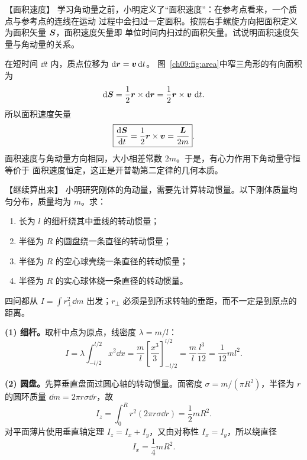 {
\begin{origexamplebox}{【面积速度】}\label{ch09:ex:s16-14-2}
学习角动量之前，小明定义了“面积速度”：在参考点看来，一个质点与参考点的连线在运动
过程中会扫过一定面积。按照右手螺旋方向把面积定义为面积矢量 $\bm{S}$，面积速度矢量即
单位时间内扫过的面积矢量。试说明面积速度矢量与角动量的关系。


\ThQArea
\end{origexamplebox}

\begin{xesolution}
\areaVelocityDiagram

在短时间 $\dd t$ 内，质点位移为 $\mathop{}\!\mathrm d\bm{r}=\bm{v}\mathop{}\!\mathrm d t$。
图~\ref{ch09:fig:area}中窄三角形的有向面积为
\[
 \mathop{}\!\mathrm d\bm{S}=\frac12\bm{r}\times\mathop{}\!\mathrm d\bm{r}
 =\frac12\bm{r}\times\bm{v}\,\mathop{}\!\mathrm d t.
\]
所以面积速度矢量
\[
 \boxed{\frac{\mathop{}\!\mathrm d\bm{S}}{\mathop{}\!\mathrm d t}
 =\frac12\bm{r}\times\bm{v}
 =\frac{\bm{L}}{2m}}.
\]
面积速度与角动量方向相同，大小相差常数 $2m$。于是，有心力作用下角动量守恒等价于
面积速度恒定，这正是开普勒第二定律的几何本质。
\end{xesolution}

\begin{origexamplebox}{【继续算出来】}\label{ch09:ex:s16-14-3}
小明研究刚体的角动量，需要先计算转动惯量。以下刚体质量均匀分布，质量均为 $m$。求：
\begin{enumerate}[label=(\arabic*),leftmargin=2.2em]
  \item 长为 $l$ 的细杆绕其中垂线的转动惯量；
  \item 半径为 $R$ 的圆盘绕一条直径的转动惯量；
  \item 半径为 $R$ 的空心球壳绕一条直径的转动惯量；
  \item 半径为 $R$ 的实心球体绕一条直径的转动惯量。
\end{enumerate}

\ThQInertias
\end{origexamplebox}

\begin{xesolution}
四问都从 $I=\int r_\perp^2\dd m$ 出发；$r_\perp$ 必须是到所求转轴的垂距，而不一定是到原点的距离。

\textbf{(1) 细杆。}\quad 取杆中点为原点，线密度 $\lambda=m/l$：
\[
 I=\lambda\int_{-l/2}^{l/2}x^2\dd x
 =\frac ml\left[\frac{x^3}{3}\right]_{-l/2}^{l/2}
 =\frac ml\frac{l^3}{12}=\boxed{\frac1{12}ml^2}.
\]

\textbf{(2) 圆盘。}\quad 先算垂直盘面过圆心轴的转动惯量。面密度
$\sigma=m/(\pi R^2)$，半径为 $r$ 的圆环质量 $\dd m=2\pi r\sigma\dd r$，故
\[
 I_z=\int_0^Rr^2(2\pi r\sigma\dd r)=\frac12mR^2.
\]
对平面薄片使用垂直轴定理 $I_z=I_x+I_y$，又由对称性 $I_x=I_y$，所以绕直径
\[
 \boxed{I_x=\frac14mR^2}.
\]


\end{xesolution}}
